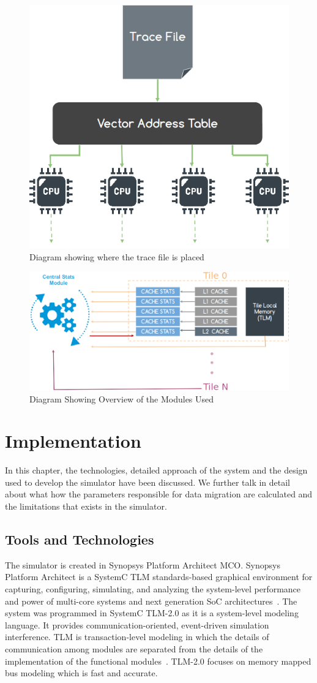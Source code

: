 \documentclass{listhesis}
\begin{document}
\begin{figure}[h!]
  \includegraphics[width=0.7\linewidth]{traceFile.png}
  \centering
  \caption{Diagram showing where the trace file is placed}
  \label{fig:traceFile}
\end{figure}

\begin{figure}
  \includegraphics[width=\linewidth]{moduleconnections.png}
  \centering
  \caption{Diagram Showing Overview of the Modules Used}
  \label{fig:overviewOfSolution}
\end{figure}
\chapter{Implementation}
In this chapter, the technologies, detailed approach of the system and the design used to develop the simulator have been discussed. We further talk in detail about what how the parameters responsible for data migration are calculated and the limitations that exists in the simulator. 
\section{Tools and Technologies}
The simulator is created in Synopsys Platform Architect MCO. Synopsys Platform Architect is a SystemC TLM standards-based graphical environment for capturing, configuring, simulating, and analyzing the system-level performance and power of multi-core systems and next generation SoC architectures~\cite{synopsys}.
The system was programmed in SystemC TLM-2.0 as it is a system-level modeling language. It provides communication-oriented, event-driven simulation interference. TLM is transaction-level modeling in which the details of communication among modules are separated from the details of the implementation of the functional modules~\cite{tlm}. TLM-2.0 focuses on memory mapped bus modeling which is fast and accurate.
\end{document}

